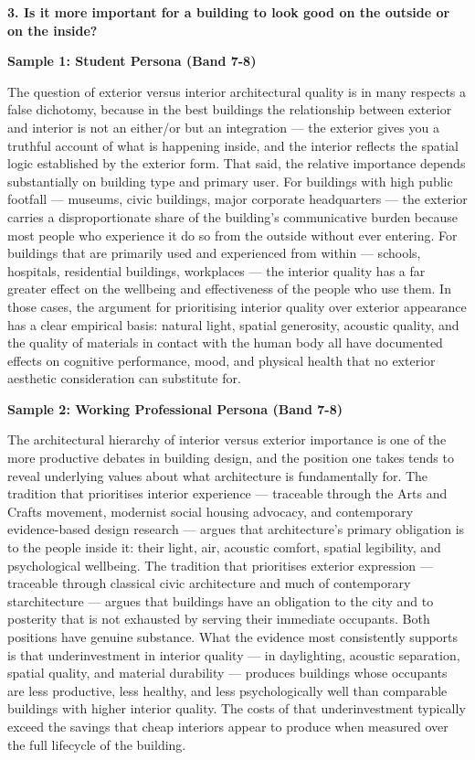 \separator

\begin{ieltsquestion}
\textbf{3. Is it more important for a building to look good on the outside or on the inside?}
\end{ieltsquestion}
\textbf{Sample 1: Student Persona (Band 7-8)}

The question of exterior versus interior architectural quality is in many respects a false dichotomy, because in the best buildings the relationship between exterior and interior is not an either/or but an integration — the exterior gives you a truthful account of what is happening inside, and the interior reflects the spatial logic established by the exterior form. That said, the relative importance depends substantially on building type and primary user. For buildings with high public footfall — museums, civic buildings, major corporate headquarters — the exterior carries a disproportionate share of the building's communicative burden because most people who experience it do so from the outside without ever entering. For buildings that are primarily used and experienced from within — schools, hospitals, residential buildings, workplaces — the interior quality has a far greater effect on the wellbeing and effectiveness of the people who use them. In those cases, the argument for prioritising interior quality over exterior appearance has a clear empirical basis: natural light, spatial generosity, acoustic quality, and the quality of materials in contact with the human body all have documented effects on cognitive performance, mood, and physical health that no exterior aesthetic consideration can substitute for.

\textbf{Sample 2: Working Professional Persona (Band 7-8)}

The architectural hierarchy of interior versus exterior importance is one of the more productive debates in building design, and the position one takes tends to reveal underlying values about what architecture is fundamentally for. The tradition that prioritises interior experience — traceable through the Arts and Crafts movement, modernist social housing advocacy, and contemporary evidence-based design research — argues that architecture's primary obligation is to the people inside it: their light, air, acoustic comfort, spatial legibility, and psychological wellbeing. The tradition that prioritises exterior expression — traceable through classical civic architecture and much of contemporary starchitecture — argues that buildings have an obligation to the city and to posterity that is not exhausted by serving their immediate occupants. Both positions have genuine substance. What the evidence most consistently supports is that underinvestment in interior quality — in daylighting, acoustic separation, spatial quality, and material durability — produces buildings whose occupants are less productive, less healthy, and less psychologically well than comparable buildings with higher interior quality. The costs of that underinvestment typically exceed the savings that cheap interiors appear to produce when measured over the full lifecycle of the building.

